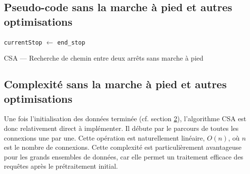 \documentclass[12pt]{article}
\begin{document}
\subsection{Pseudo-code sans la marche à pied et autres optimisations}
\begin{algorithm}[H]
  \footnotesize
  \DontPrintSemicolon
  
    

  \texttt{currentStop} $\gets$ \texttt{end\_stop} \;
  
   \;
  
  \caption{CSA --- Recherche de chemin entre deux arrêts sans marche à pied}
  \end{algorithm}
    
\subsection{Complexité sans la marche à pied et autres optimisations}
Une fois l'initialisation des données terminée (cf. section \hyperref[sec:init]{2}), l'algorithme CSA est donc relativement direct à implémenter.
Il débute par le parcours de toutes les connexions une par une. Cette opération est naturellement linéaire, $O(n)$, où $n$ est le nombre de connexions.
Cette complexité est particulièrement avantageuse pour les grands ensembles de données, car elle permet un traitement efficace 
des requêtes après le prétraitement initial.
\end{document}

